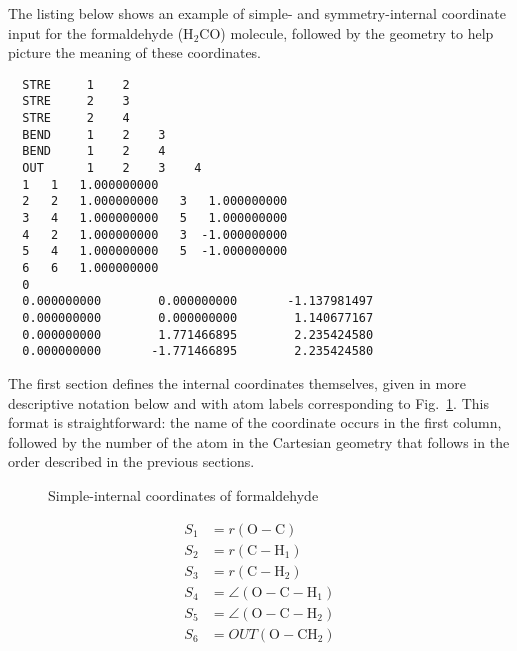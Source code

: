 \documentclass{article}
\begin{document}
The listing below shows an example of simple- and symmetry-internal coordinate
input for the formaldehyde (H$_2$CO) molecule, followed by the geometry to help
picture the meaning of these coordinates.

\begin{lstlisting}
  STRE     1    2
  STRE     2    3
  STRE     2    4
  BEND     1    2    3
  BEND     1    2    4
  OUT      1    2    3    4
  1   1   1.000000000
  2   2   1.000000000   3   1.000000000
  3   4   1.000000000   5   1.000000000
  4   2   1.000000000   3  -1.000000000
  5   4   1.000000000   5  -1.000000000
  6   6   1.000000000
  0
  0.000000000        0.000000000       -1.137981497
  0.000000000        0.000000000        1.140677167
  0.000000000        1.771466895        2.235424580
  0.000000000       -1.771466895        2.235424580
\end{lstlisting}

The first section defines the internal coordinates themselves, given in more
descriptive notation below and with atom labels corresponding to
Fig.~\ref{fig:h2co}. This format is straightforward: the name of the coordinate
occurs in the first column, followed by the number of the atom in the Cartesian
geometry that follows in the order described in the previous sections.

\begin{figure}[ht]
  \centering
  \caption{Simple-internal coordinates of formaldehyde}
  \label{fig:h2co}

\end{figure}

\begin{align}
  S_1 &= r(\text{O}-\text{C}) \\
  S_2 &= r(\text{C}-\text{H}_1) \\
  S_3 &= r(\text{C}-\text{H}_2) \\
  S_4 &= \angle(\text{O}-\text{C}-\text{H}_1) \\
  S_5 &= \angle(\text{O}-\text{C}-\text{H}_2) \\
  S_6 &= OUT(\text{O}-\text{CH}_2)
\end{align}
\end{document}
